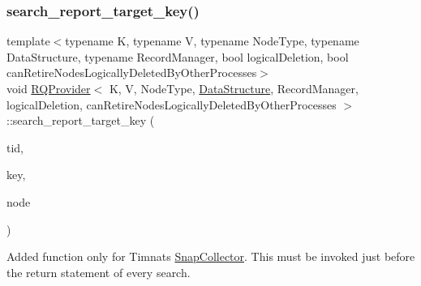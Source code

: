 \mbox{\label{classRQProvider_a716d3f717f43a9e382e088cb3b18e388}} 
\subsubsection{\texorpdfstring{search\+\_\+report\+\_\+target\+\_\+key()}{search\_report\_target\_key()}}
{\footnotesize\ttfamily template$<$typename K, typename V, typename Node\+Type, typename Data\+Structure, typename Record\+Manager, bool logical\+Deletion, bool can\+Retire\+Nodes\+Logically\+Deleted\+By\+Other\+Processes$>$ \\
void \hyperlink{classRQProvider}{R\+Q\+Provider}$<$ K, V, Node\+Type, \hyperlink{classDataStructure}{Data\+Structure}, Record\+Manager, logical\+Deletion, can\+Retire\+Nodes\+Logically\+Deleted\+By\+Other\+Processes $>$\+::search\+\_\+report\+\_\+target\+\_\+key (\begin{DoxyParamCaption}\item[{const int}]{tid,  }\item[{const K}]{key,  }\item[{Node\+Type $\ast$const}]{node }\end{DoxyParamCaption})\hspace{0.3cm}{\ttfamily [inline]}}

Added function only for Timnat\textquotesingle{}s \hyperlink{classSnapCollector}{Snap\+Collector}. This must be invoked just before the return statement of every search. \mbox{\label{classRQProvider_ad4bbd6a7d5ea8f497a49ba3bbd03f7fc}} 
